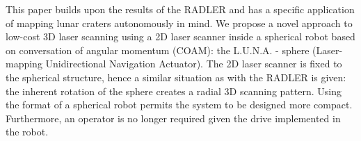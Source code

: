 This paper builds upon the results of the RADLER and has a specific application of mapping lunar craters autonomously in mind. We propose a novel approach to low-cost 3D laser scanning using a 2D laser scanner inside a spherical robot based on conversation of angular momentum (COAM): the L.U.N.A. - sphere (Laser-mapping Unidirectional Navigation Actuator). The 2D laser scanner is fixed to the spherical structure, hence a similar situation as with the RADLER is given: the inherent rotation of the sphere creates a radial 3D scanning pattern. Using the format of a spherical robot permits the system to be designed more compact. Furthermore, an operator is no longer required given the drive implemented in the robot.
